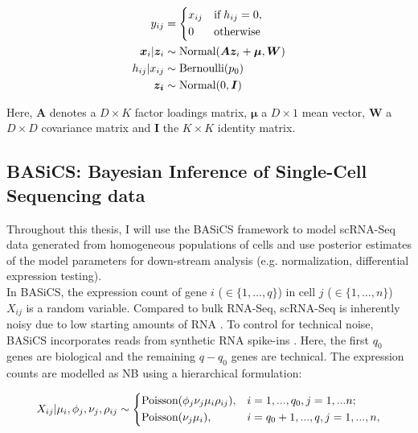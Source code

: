 \begin{align*}
y_{ij} & = 
 \left\lbrace
  \begin{aligned}
    & x_{ij} && \textnormal{if} \; h_{ij} = 0,  \\ 
    & 0 && \textnormal{otherwise}    	    
  \end{aligned}
\right.\\
\bm{x}_{i}|\bm{z}_i&\sim{}\textnormal{Normal}(\bm{Az}_i+\bm{\mu},\bm{W})\\
h_{ij}|x_{ij} & \sim \textnormal{Bernoulli}(p_0)\\
\bm{z_i}&\sim{}\textnormal{Normal}(0,\bm{I})
\end{align*} 

Here, $\bm{A}$ denotes a $D\times{}K$ factor loadings matrix, $\bm{\mu}$ a $D\times{}1$ mean vector, $\bm{W}$ a $D\times{}D$ covariance matrix and $\bm{I}$ the $K\times{}K$ identity matrix.

\newpage

\subsection{BASiCS: Bayesian Inference of Single-Cell Sequencing data} 
\label{sec0:BASiCS}

Throughout this thesis, I will use the \gls{BASiCS} framework \citep{Vallejos2015BASiCS, Vallejos2016} to model scRNA-Seq data generated from homogeneous populations of cells and use posterior estimates of the model parameters for down-stream analysis (e.g. normalization, differential expression testing).\\

In BASiCS, the expression count of gene $i$ ($ \in \{1, \ldots, q\}$) in cell $j$ ($\in \{ 1, \ldots ,n\}$) $X_{ij}$ is a random variable. Compared to bulk RNA-Seq, scRNA-Seq is inherently noisy due to low starting amounts of RNA \citep{Brennecke2013}. To control for technical noise, BASiCS incorporates reads from synthetic RNA spike-ins \citep{Jiang2011}. Here, the first $q_0$ genes are biological and the  remaining $q-q_0$ genes are technical. The expression counts are modelled as NB using a hierarchical formulation:

\begin{equation} 
 X_{ij}|\mu_i,\phi_j,\nu_j,\rho_{ij} \sim
 \left\lbrace
  \begin{aligned}
    &\textnormal{Poisson}(\phi_j\nu_j\mu_i\rho_{ij}), && i=1,...,q_0,j=1,...n;  \\ 
    &\textnormal{Poisson}(\nu_j\mu_i), && i=q_0+1,...,q,j=1,...,n,    	    
  \end{aligned}
\right.
\end{equation} 

